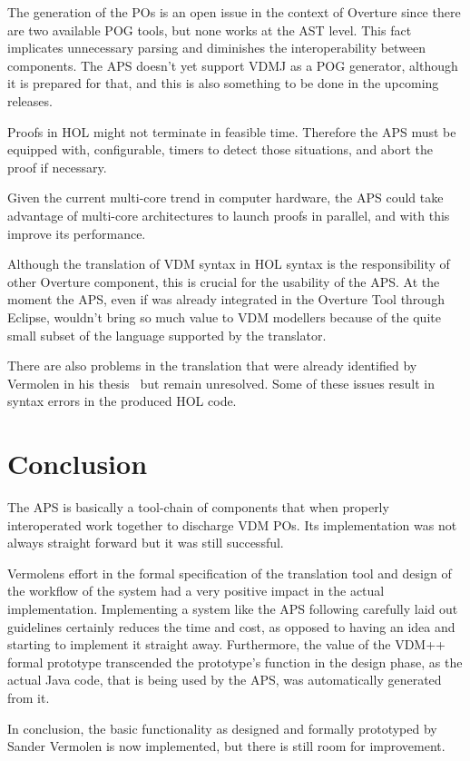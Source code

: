 \documentclass[]{article}
\begin{document}


The generation of the POs is an open issue in the context of Overture since there are two available POG tools, but none works at the AST level.
This fact implicates unnecessary parsing and diminishes the interoperability between components.
The APS doesn't yet support VDMJ as a POG generator, although it is prepared for that, and this is also something to be done in the upcoming releases.

Proofs in HOL might not terminate in feasible time.
Therefore the APS must be equipped with, configurable, timers to detect those situations, and abort the proof if necessary.

Given the current multi-core trend in computer hardware, the APS could take advantage of multi-core architectures to launch proofs in parallel, and with this improve its performance.

Although the translation of VDM syntax in HOL syntax is the responsibility of other Overture component, this is crucial for the usability of the APS.
At the moment the APS, even if was already integrated in the Overture Tool through Eclipse, wouldn't bring so much value to VDM modellers because of the quite small subset of the language supported by the translator.

There are also problems in the translation that were already identified by Vermolen in his thesis~\cite[Section 7.3]{Vermolen07} but remain unresolved.
Some of these issues result in syntax errors in the produced HOL code.

\section{Conclusion}
\label{sec:conclusion}

The APS is basically a tool-chain of components that when properly interoperated work together to discharge VDM POs.
Its implementation was not always straight forward but it was still successful.

Vermolens effort in the formal specification of the translation tool and design of the workflow of the system had a very positive impact in the actual implementation.
Implementing a system like the APS following carefully laid out guidelines certainly reduces the time and cost, as opposed to having an idea and starting to implement it straight away.
Furthermore, the value of the VDM++ formal prototype transcended the prototype's function in the design phase, as the actual Java code, that is being used by the APS, was automatically generated from it.

In conclusion, the basic functionality as designed and formally prototyped by Sander Vermolen is now implemented, but there is still room for improvement.



\end{document}
